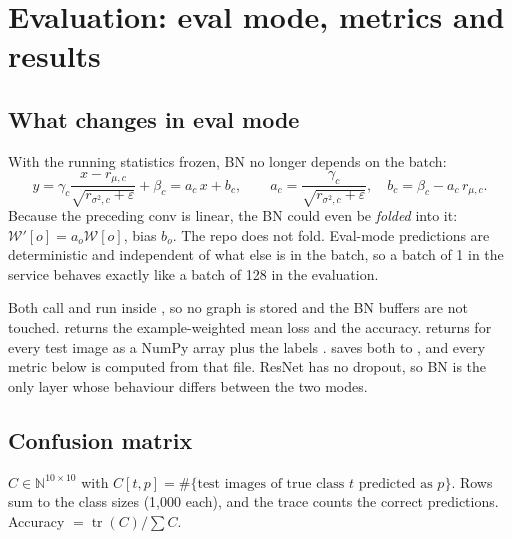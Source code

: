 \section{Evaluation: eval mode, metrics and results}
\label{sec:eval}

\subsection{What changes in eval mode}
\label{sec:evalbn}

\begin{idea}
With the running statistics frozen, BN no longer depends on the batch:
\[
  y = \gamma_c\frac{x-r_{\mu,c}}{\sqrt{r_{\sigma^2,c}+\varepsilon}}+\beta_c
    = a_c\,x + b_c,\qquad a_c=\frac{\gamma_c}{\sqrt{r_{\sigma^2,c}+\varepsilon}},\quad b_c=\beta_c-a_c\,r_{\mu,c}.
\]
Because the preceding conv is linear, the BN could even be \emph{folded} into it: $\mathcal W'[o]=a_o\mathcal W[o]$, bias $b_o$. The repo does not fold. Eval-mode predictions are deterministic and independent of what else is in the batch, so a batch of 1 in the service behaves exactly like a batch of 128 in the evaluation.
\end{idea}

\begin{repo}
Both call  and run inside , so no graph is stored and the BN buffers are not touched.  returns the example-weighted mean loss and the accuracy.  returns  for every test image as a NumPy array  plus the labels .  saves both to , and every metric below is computed from that file. ResNet has no dropout, so BN is the only layer whose behaviour differs between the two modes.
\end{repo}

\subsection{Confusion matrix}

\begin{idea}
$C\in\mathbb N^{10\times10}$ with $C[t,p]=\#\{\text{test images of true class }t\text{ predicted as }p\}$. Rows sum to the class sizes (1{,}000 each), and the trace counts the correct predictions. Accuracy $=\operatorname{tr}(C)/\sum C$.
\end{idea}

